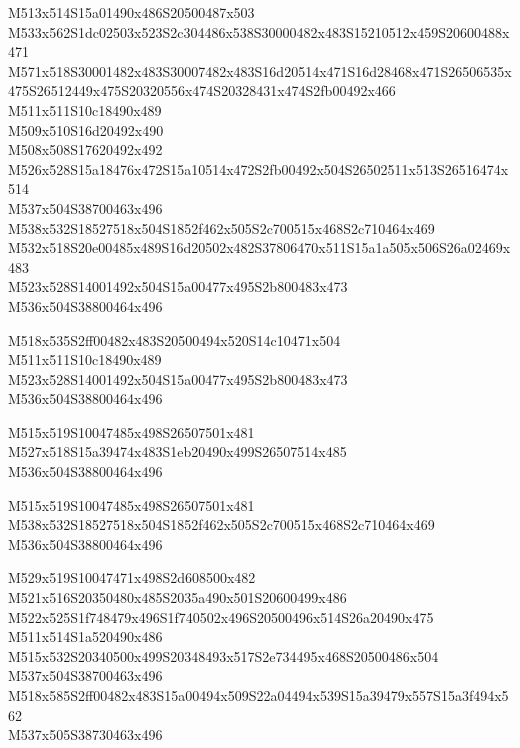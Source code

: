 \documentclass{article}
\begin{document}
\begin{multicols}{5}
\begin{center}

M513x514S15a01490x486S20500487x503 %
\\M533x562S1dc02503x523S2c304486x538S30000482x483S15210512x459S20600488x471 %
\\M571x518S30001482x483S30007482x483S16d20514x471S16d28468x471S26506535x475S26512449x475S20320556x474S20328431x474S2fb00492x466 %
\\M511x511S10c18490x489 %
\\M509x510S16d20492x490 %
\\M508x508S17620492x492 %
\\M526x528S15a18476x472S15a10514x472S2fb00492x504S26502511x513S26516474x514 %
\\M537x504S38700463x496 %
\\M538x532S18527518x504S1852f462x505S2c700515x468S2c710464x469 %
\\M532x518S20e00485x489S16d20502x482S37806470x511S15a1a505x506S26a02469x483 %
\\M523x528S14001492x504S15a00477x495S2b800483x473 %
\\M536x504S38800464x496 %

M518x535S2ff00482x483S20500494x520S14c10471x504 %
\\M511x511S10c18490x489 %
\\M523x528S14001492x504S15a00477x495S2b800483x473 %
\\M536x504S38800464x496 %

M515x519S10047485x498S26507501x481 %
\\M527x518S15a39474x483S1eb20490x499S26507514x485 %
\\M536x504S38800464x496 %

M515x519S10047485x498S26507501x481 %
\\M538x532S18527518x504S1852f462x505S2c700515x468S2c710464x469 %
\\M536x504S38800464x496 %

M529x519S10047471x498S2d608500x482 %
\\M521x516S20350480x485S2035a490x501S20600499x486 %
\\M522x525S1f748479x496S1f740502x496S20500496x514S26a20490x475 %
\\M511x514S1a520490x486 %
\\M515x532S20340500x499S20348493x517S2e734495x468S20500486x504 %
\\M537x504S38700463x496 %
\\M518x585S2ff00482x483S15a00494x509S22a04494x539S15a39479x557S15a3f494x562 %
\\M537x505S38730463x496 %


\end{center}
\end{multicols}
\end{document}
